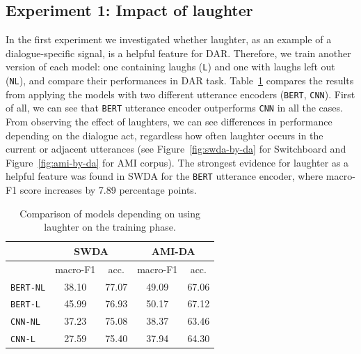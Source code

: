 \documentclass[11pt,a4paper]{article}
\begin{document}
\subsection{Experiment 1: Impact of laughter} \label{sec:experiment1}   %
In the first experiment we investigated whether laughter, as an example of a dialogue-specific signal, is a helpful feature for DAR.
Therefore, we train another version of each model: one containing laughs (\texttt{L}) and one with laughs left out (\texttt{NL}), and compare their performances in DAR task.
Table~\ref{table:laughter-total-acc} compares the results from applying the models with two different utterance encoders (\texttt{BERT}, \texttt{CNN}).
First of all, we can see that \texttt{BERT} utterance encoder outperforms \texttt{CNN} in all the cases.
From observing the effect of laughters, we can see differences in performance depending on the dialogue act, regardless how often laughter occurs in the current or adjacent utterances (see Figure~\ref{fig:swda-by-da} for Switchboard and Figure~\ref{fig:ami-by-da} for AMI corpus).
The strongest evidence for laughter as a helpful feature was found in SWDA for the \texttt{BERT} utterance encoder, where macro-F1 score increases by 7.89 percentage points.

\begin{table}
  \centering
  \begin{tabular}{@{}lcccc@{}}
    \toprule
                      & \multicolumn{2}{c}{SWDA} & \multicolumn{2}{c}{AMI-DA} \\ \midrule
                      & macro-F1 & acc. & macro-F1 & acc.       \\ 
    \texttt{BERT-NL}  & 38.10 & 77.07 & 49.09 & 67.06       \\ 
    \texttt{BERT-L}   & 45.99 & 76.93 & 50.17 & 67.12       \\ \midrule
    \texttt{CNN-NL}   & 37.23 & 75.08 & 38.37 & 63.46        \\
    \texttt{CNN-L}    & 27.59 & 75.40 & 37.94 & 64.30        \\ \bottomrule
    
  \end{tabular}
  \caption{Comparison of models depending on using laughter on the training phase. }
  \label{table:laughter-total-acc}
\end{table}

\end{document}
